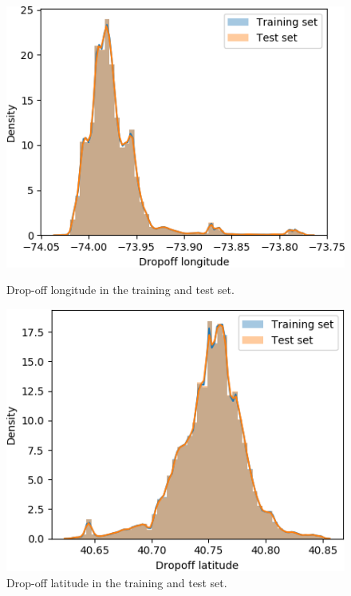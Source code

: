 \documentclass[a4paper]{article}
\begin{document}
\begin{figure}
    \centering
    \begin{minipage}{.45\textwidth}
        \includegraphics[width=\linewidth]{test_vs_train_long}
        \caption{Drop-off longitude in the training and test set.}
        \label{test_vs_train_long}
    \end{minipage}
    \hspace{0.05\textwidth}
   \begin{minipage}{.45\textwidth}
       \includegraphics[width=\linewidth]{test_vs_train_lat}
       \caption{Drop-off latitude in the training and test set.}
       \label{test_vs_train_lat}
    \end{minipage}
\end{figure}
\end{document}
